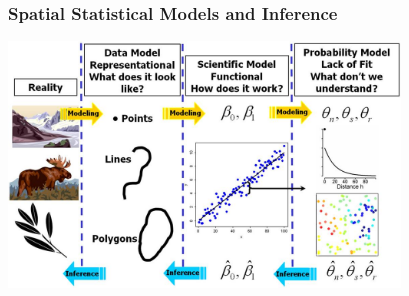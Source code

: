 \documentclass[mathserif,compress]{beamer}\usepackage{graphicx, color}
\begin{document}
\begin{frame} 
\frametitle{Spatial Statistical Models and Inference}
     
		\begin{center}
		  \vspace{-.5cm}
			\includegraphics[width=10.4cm]{figure/repSpModInfer.jpg} 
		\end{center} 
\end{frame}

\end{document}
